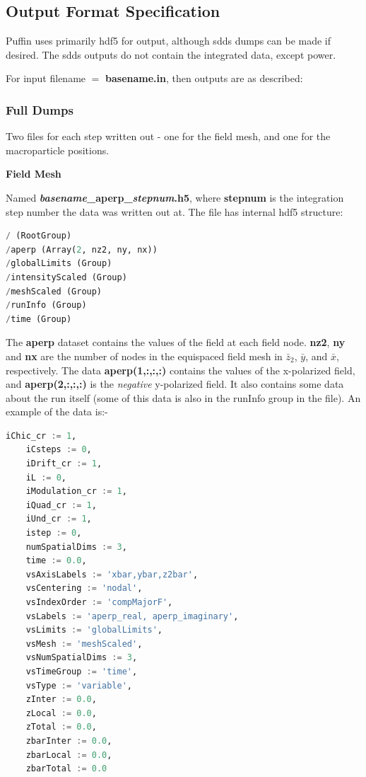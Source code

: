 \documentclass[12pt]{article}%
\begin{document}
\subsection{Output Format Specification}

Puffin uses primarily hdf5 for output, although sdds dumps can be made if desired. The sdds outputs do not contain the integrated data, except power.

For input filename $=$ {\bf basename.in}, then outputs are as described:

\subsubsection{Full Dumps}

Two files for each step written out - one for the field mesh, and one for the macroparticle positions.

{\bf Field Mesh}

Named {\bf \textit{basename}\_aperp\_\textit{stepnum}.h5}, where {\bf stepnum} is the integration step number the data was written out at. The file has internal hdf5 structure:

\begin{lstlisting}[language=python]
/ (RootGroup) 
/aperp (Array(2, nz2, ny, nx)) 
/globalLimits (Group) 
/intensityScaled (Group) 
/meshScaled (Group) 
/runInfo (Group) 
/time (Group) 
\end{lstlisting}

The {\bf aperp} dataset contains the values of the field at each field node. {\bf nz2}, {\bf ny} and {\bf nx} are the number of nodes in the equispaced field mesh in $\bar{z}_2$, $\bar{y}$, and $\bar{x}$, respectively. The data {\bf aperp(1,:,:,:)} contains the values of the x-polarized field, and {\bf aperp(2,:,:,:)} is the \textit{negative} y-polarized field.  It also contains some data about the run itself (some of this data is also in the runInfo group in the file). An example of the data is:-

\begin{lstlisting}[language=python]
    iChic_cr := 1,
    iCsteps := 0,
    iDrift_cr := 1,
    iL := 0,
    iModulation_cr := 1,
    iQuad_cr := 1,
    iUnd_cr := 1,
    istep := 0,
    numSpatialDims := 3,
    time := 0.0,
    vsAxisLabels := 'xbar,ybar,z2bar',
    vsCentering := 'nodal',
    vsIndexOrder := 'compMajorF',
    vsLabels := 'aperp_real, aperp_imaginary',
    vsLimits := 'globalLimits',
    vsMesh := 'meshScaled',
    vsNumSpatialDims := 3,
    vsTimeGroup := 'time',
    vsType := 'variable',
    zInter := 0.0,
    zLocal := 0.0,
    zTotal := 0.0,
    zbarInter := 0.0,
    zbarLocal := 0.0,
    zbarTotal := 0.0
\end{lstlisting}
\end{document}
